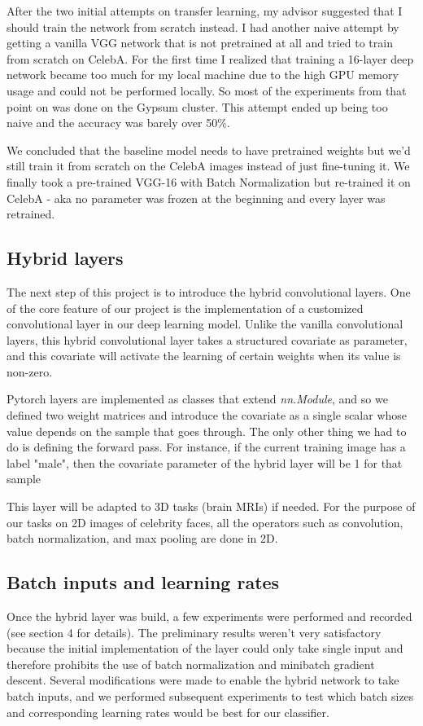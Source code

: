 \documentclass[12pt]{article}
\begin{document}
After the two initial attempts on transfer learning, my advisor suggested that I should train the network from scratch instead. I had another naive attempt by getting a vanilla VGG network that is not pretrained at all and tried to train from scratch on CelebA. For the first time I realized that training a 16-layer deep network became too much for my local machine due to the high GPU memory usage and could not be performed locally. So most of the experiments from that point on was done on the Gypsum cluster. This attempt ended up being too naive and the accuracy was barely over 50\%.

We concluded that the baseline model needs to have pretrained weights but we'd still train it from scratch on the CelebA images instead of just fine-tuning it. We finally took a pre-trained VGG-16 with Batch Normalization but re-trained it on CelebA - aka no parameter was frozen at the beginning and every layer was retrained. 

\subsection{Hybrid layers}
The next step of this project is to introduce the hybrid convolutional layers. One of the core feature of our project is the implementation of a customized convolutional layer in our deep learning model. Unlike the vanilla convolutional layers, this hybrid convolutional layer takes a structured covariate as parameter, and this covariate will activate the learning of certain weights when its value is non-zero.

Pytorch layers are implemented as classes that extend \textit{nn.Module}, and so we defined two weight matrices and introduce the covariate as a single scalar whose value depends on the sample that goes through. The only other thing we had to do is defining the forward pass. For instance, if the current training image has a label "male", then the covariate parameter of the hybrid layer will be 1 for that sample

This layer will be adapted to 3D tasks (brain MRIs) if needed. For the purpose of our tasks on 2D images of celebrity faces, all the operators such as convolution, batch normalization, and max pooling are done in 2D. 

\subsection{Batch inputs and learning rates}
Once the hybrid layer was build, a few experiments were performed and recorded (see section 4 for details). The preliminary results weren't very satisfactory because the initial implementation of the layer could only take single input and therefore prohibits the use of batch normalization and minibatch gradient descent. Several modifications were made to enable the hybrid network to take batch inputs, and we performed subsequent experiments to test which batch sizes and corresponding learning rates would be best for our classifier. 
\end{document}
